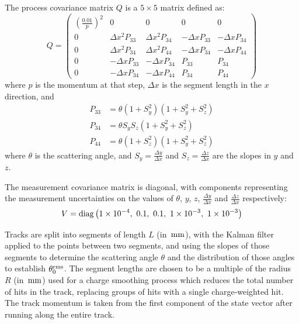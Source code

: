 The process covariance matrix $Q$ is a $5\times 5$ matrix defined as:~\citep{Wolin1993}
\begin{equation}\label{eqn:kalman_process_covariance_matrix}
    Q = \left(
    \begin{array}{ccccc}

        \left(\frac{0.01}{p}\right)^2 &                 0 &                 0 &                0 &                0 \\
                                    0 & \Delta x^2 P_{33} & \Delta x^2 P_{34} & -\Delta x P_{33} & -\Delta x P_{34} \\
                                    0 & \Delta x^2 P_{34} & \Delta x^2 P_{44} & -\Delta x P_{34} & -\Delta x P_{44} \\
                                    0 & -\Delta x P_{33}  & -\Delta x P_{34}  & P_{33}           & P_{34}           \\
                                    0 & -\Delta x P_{34}  & -\Delta x P_{44}  & P_{34}           & P_{44}           

    \end{array}
    \right)
\end{equation}
where $p$ is the momentum at that step, $\Delta x$ is the segment length in the $x$ direction, and
\begin{align*}
    P_{33} &= \theta (1 + S_y^2)(1 + S_y^2 + S_z^2) \\
    P_{34} &= \theta S_y S_z(1 + S_y^2 + S_z^2) \\
    P_{44} &= \theta (1 + S_z^2)(1 + S_y^2 + S_z^2)
\end{align*}
where $\theta$ is the scattering angle, and $\displaystyle S_y=\frac{\Delta y}{\Delta x}$ and $\displaystyle S_z = \frac{\Delta z}{\Delta x}$ are the slopes in $y$ and $z$.

The measurement covariance matrix is diagonal, with components representing the measurement uncertainties on the values of $\theta$, $y$, $z$, $\displaystyle\frac{\Delta y}{\Delta x}$ and $\displaystyle\frac{\Delta z}{\Delta x}$ respectively:
\begin{equation}\label{eqn:kalman_measurement_covariance_matrix}
    V = \mathrm{diag} \left( 1\times10^{-4}, ~ 0.1, ~ 0.1, ~ 1\times10^{-3}, ~ 1\times10^{-3} \right)
\end{equation}

Tracks are split into segments of length $L$ (in $\,\mathrm{mm}$), with the Kalman filter applied to the points between two segments, and using the slopes of those segments to determine the scattering angle $\theta$ and the distribution of those angles to establish $\theta_0^{\mathrm{rms}}$. The segment lengths are chosen to be a multiple of the radius $R$ (in $\,\mathrm{mm}$) used for a charge smoothing process which reduces the total number of hits in the track, replacing groups of hits with a single charge-weighted hit. The track momentum is taken from the first component of the state vector after running along the entire track.

